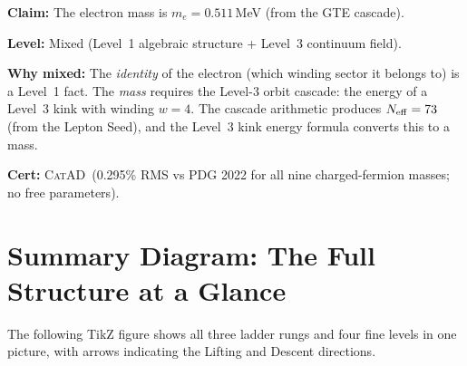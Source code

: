 \documentclass[11pt,a4paper]{article}
\newcommand{\CatAD}{\textsc{CatAD}}
\begin{document}
\begin{tcolorbox}[colback=boxtan,colframe=orange!50!black,
  title=Mixed-level example: particle masses]
\textbf{Claim:} The electron mass is $m_e = 0.511$\,MeV (from the GTE cascade).

\textbf{Level:} Mixed (Level~1 algebraic structure + Level~3 continuum field).

\textbf{Why mixed:} The \emph{identity} of the electron (which winding sector
it belongs to) is a Level~1 fact.
The \emph{mass} requires the Level-3 orbit cascade: the energy of a Level~3
kink with winding $w = 4$.
The cascade arithmetic produces $N_{\rm eff} = 73$ (from the Lepton Seed),
and the Level~3 kink energy formula converts this to a mass.

\textbf{Cert:} \CatAD\ (0.295\% RMS vs PDG 2022 for all nine charged-fermion
masses; no free parameters).
\end{tcolorbox}

\section{Summary Diagram: The Full Structure at a Glance}
\label{sec:diagram}

The following TikZ figure shows all three ladder rungs and four fine levels in
one picture, with arrows indicating the Lifting and Descent directions.
\end{document}
